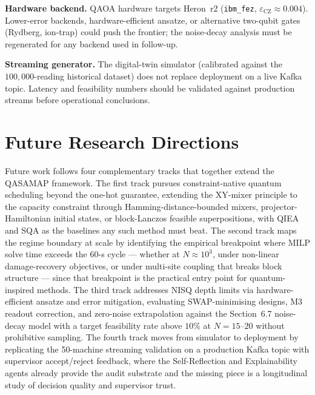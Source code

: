 \textbf{Hardware backend.} QAOA hardware targets Heron~r2 (\texttt{ibm\_fez}, $\varepsilon_{\text{CZ}}\approx 0.004$). Lower-error backends, hardware-efficient ansatze, or alternative two-qubit gates (Rydberg, ion-trap) could push the frontier; the noise-decay analysis must be regenerated for any backend used in follow-up.

\textbf{Streaming generator.} The digital-twin simulator (calibrated against the $100{,}000$-reading historical dataset) does not replace deployment on a live Kafka topic. Latency and feasibility numbers should be validated against production streams before operational conclusions.

\section{Future Research Directions}

Future work follows four complementary tracks that together extend the QASAMAP framework. The first track pursues constraint-native quantum scheduling beyond the one-hot guarantee, extending the XY-mixer principle to the capacity constraint through Hamming-distance-bounded mixers, projector-Hamiltonian initial states, or block-Lanczos feasible superpositions, with QIEA and SQA as the baselines any such method must beat. The second track maps the regime boundary at scale by identifying the empirical breakpoint where MILP solve time exceeds the $60$-s cycle --- whether at $N\approx 10^3$, under non-linear damage-recovery objectives, or under multi-site coupling that breaks block structure --- since that breakpoint is the practical entry point for quantum-inspired methods. The third track addresses NISQ depth limits via hardware-efficient ansatze and error mitigation, evaluating SWAP-minimising designs, M3 readout correction, and zero-noise extrapolation against the Section~6.7 noise-decay model with a target feasibility rate above $10\%$ at $N=15$--$20$ without prohibitive sampling. The fourth track moves from simulator to deployment by replicating the 50-machine streaming validation on a production Kafka topic with supervisor accept/reject feedback, where the Self-Reflection and Explainability agents already provide the audit substrate and the missing piece is a longitudinal study of decision quality and supervisor trust.
